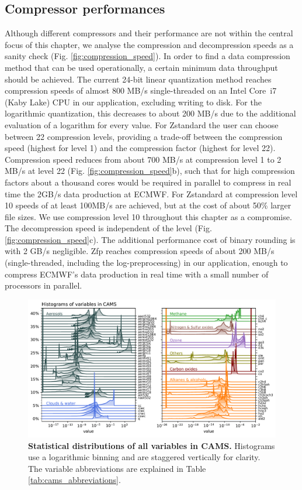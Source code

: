 \subsection{Compressor performances}

Although different compressors and their performance are not within the central focus of this chapter, we analyse
the compression and decompression speeds as a sanity check (Fig. \ref{fig:compression_speed}). In order to
find a data compression method that can be used operationally, a certain minimum data throughput should be achieved.
The current 24-bit linear quantization method reaches compression speeds of almost 800 MB/s single-threaded on an
Intel Core\texttrademark~i7 (Kaby Lake) CPU in our application, excluding writing to disk. For the logarithmic quantization,
this decreases to about 200 MB/s due to the additional evaluation of a logarithm for every value. For Zstandard the user
can choose between 22 compression levels, providing a trade-off between the compression speed (highest for level 1)
and the compression factor (highest for level 22). Compression speed reduces from about 700 MB/s at compression level 1
to 2 MB/s at level 22 (Fig. \ref{fig:compression_speed}b), such that for high compression factors about a thousand cores
would be required in parallel to compress in real time the 2GB/s data production at ECMWF. For Zstandard at compression
level 10 speeds of at least 100MB/s are achieved, but at the cost of about 50\% larger file sizes. We use compression level
10 throughout this chapter as a compromise. The decompression speed is independent of the level (Fig. \ref{fig:compression_speed}c).
The additional performance cost of binary rounding is with 2 GB/s negligible. Zfp reaches compression speeds of about 200 MB/s
(single-threaded, including the log-preprocessing) in our application, enough to compress ECMWF’s data production in real
time with a small number of processors in parallel.

\begin{figure}[tbhp]
	\includegraphics[width=1\textwidth]{Figures/compression/histograms.pdf}
	\caption{\textbf{Statistical distributions of all variables in CAMS.}
	Histograms use a logarithmic binning and are staggered vertically for clarity.
	The variable abbreviations are explained in Table \ref{tab:cams_abbreviations}.}
	\label{fig:cams_histograms}
\end{figure}

